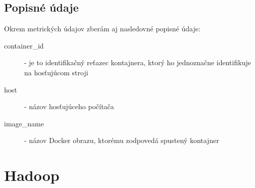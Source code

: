 \documentclass[printed,11pt,twoside,color,cover,table]{fithesis3}
\begin{document}
\subsection{Popisné údaje}
Okrem metrických údajov zberám aj nasledovné popisné údaje:
\begin{description}
\item[container\_id] - je to identifikačný reťazec kontajnera, ktorý ho jednoznačne identifikuje na hosťujúcom stroji
\item[host] - názov hosťujúceho počítača
\item[image\_name] - názov Docker obrazu, ktorému zodpovedá spustený kontajner
\end{description}

\section{Hadoop}
\end{document}
